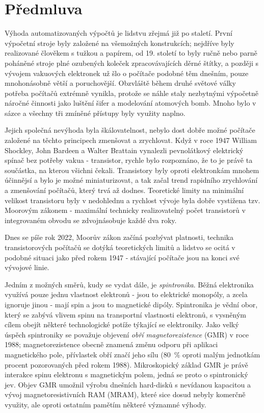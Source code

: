 \chapter*{Předmluva}

Výhoda automatizovaných výpočtů je lidstvu zřejmá již po staletí.
První výpočetní stroje byly založené na všemožných konstrukcích; nejdříve byly realizované člověkem s tužkou a papírem, od 19. století to byly ručně nebo parně poháněné stroje plné ozubených koleček zpracovávajících děrné štítky, a později s vývojem vakuových elektronek už šlo o počítače podobné těm dnešním, pouze mnohonásobně větší a poruchovější.
Obzvláště během druhé světové války potřeba počítačů extrémně vynikla, protože se náhle staly nezbytnými výpočetně náročné činnosti jako luštění šifer a modelování atomových bomb. Mnoho bylo v sázce a všechny tři zmíněné přístupy byly využity naplno.

Jejich společná nevýhoda byla škálovatelnost, nebylo dost dobře možné počítače založené na těchto principech zmenšovat a zrychlovat.
Když v roce 1947 William Shockley, John Bardeen a Walter Brattain vynalezli pevnolátkový elektrický spínač bez potřeby vakua - transistor, rychle bylo rozpoznáno, že to je právě ta součástka, na kterou všichni čekali.
Transistory byly oproti elektronkám mnohem účinnějsí a bylo je možné miniaturizovat, a tak začal trend rapidního zrychlování a zmenšování počítačů, který trvá až dodnes.
Teoretické limity na minimální velikost transistoru byly v nedohlednu a rychlost vývoje byla dobře vystižena tzv. Moorovým zákonem - maximální technicky realizovatelný počet transistorů v integrovaném obvodu se zdvojnásobuje každé dva roky.

Dnes se píše rok 2022, Moorův zákon začíná pozbývat platnosti, technika transistorových počítačů se dotýká teoretických limitů a lidstvo se ocitá v podobné situaci jako před rokem 1947 - stávající počítače jsou na konci své vývojové linie.

Jedním z možných směrů, kudy se vydat dále, je \emph{spintronika}.
Běžná elektronika využívá pouze jednu vlastnost elektronů - jsou to elektrické monopóly, a zcela ignoruje jinou - mají spin a jsou to magnetické dipóly.
Spintronika je vědní obor, který se zabývá vlivem spinu na transportní vlastnosti elektronů, s vysněným cílem obejít některé technologické potíže týkající se elektroniky.
Jako velký úspěch spintroniky se považuje objevení \emph{obří magnetorezistence} (GMR) v roce 1988; magnetorezistence obecně znamená změnu odporu při aplikaci magnetického pole, přívlastek obří značí jeho sílu (\SI{80}{\percent} oproti malým jednotkám procent pozorovaných před rokem 1988).
Mikroskopický základ GMR je právě interakce spinu elektronu s magnetickým polem, jedná se proto o spintronický jev.
Objev GMR umožnil výrobu dnešních hard-disků s nevídanou kapacitou a vývoj magnetoresistivních RAM (MRAM), které sice dosud nebyly komerčně využity, ale oproti ostatním pamětím některé významné výhody.

